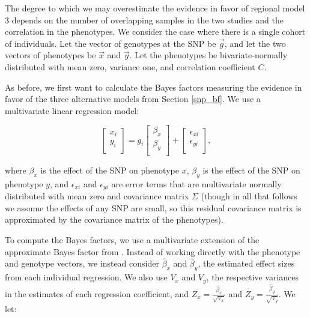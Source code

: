 \documentclass[11pt,titlepage]{article}
\begin{document}
The degree to which we may overestimate the evidence in favor of regional model 3 depends on the number of overlapping samples in the two studies and the correlation in the phenotypes. We consider the case where there is a single cohort of individuals. Let the vector of genotypes at the SNP be $\vec g$, and let the two vectors of phenotypes be $\vec x$ and $\vec y$. Let the phenotypes be bivariate-normally distributed with mean zero, variance one, and correlation coefficient $C$.

As before, we first want to calculate the Bayes factors measuring the evidence in favor of the three alternative models from Section \ref{snp_bf}. We use a multivariate linear regression model:

\begin{equation}
 \begin{bmatrix}
     x_{i}        \\[0.3em]
       y_{i}     \\[0.3em]
     \end{bmatrix}
      = g_i 
      \begin{bmatrix}
     \beta_x        \\[0.3em]
       \beta_y     \\[0.3em]
     \end{bmatrix}
     + 
         \begin{bmatrix}
    \epsilon_{xi}      \\[0.3em]
      \epsilon_{yi}   \\[0.3em]
     \end{bmatrix},
\end{equation}

\noindent where $\beta_x$ is the effect of the SNP on phenotype $x$,  $\beta_y$ is the effect of the SNP on phenotype $y$, and $\epsilon_{xi}$ and $\epsilon_{yi}$ are error terms that are multivariate normally distributed with mean zero and covariance matrix $\Sigma$ (though in all that follows we assume the effects of any SNP are small, so this residual covariance matrix is approximated by the covariance matrix of the phenotypes). 

To compute the Bayes factors, we use a multivariate extension of the approximate Bayes factor from \citet{Wakefield:2008hc}. Instead of working directly with the phenotype and genotype vectors, we instead consider $\hat \beta_x$ and $\hat \beta_y$, the estimated effect sizes from each individual regression. We also use $V_x$ and $V_y$, the respective variances in the estimates of each regression coefficient, and $Z_x = \frac{\hat \beta_x}{\sqrt{V_x}}$ and  $Z_y = \frac{\hat \beta_y}{\sqrt{V_y}}$. We let:
\end{document}
